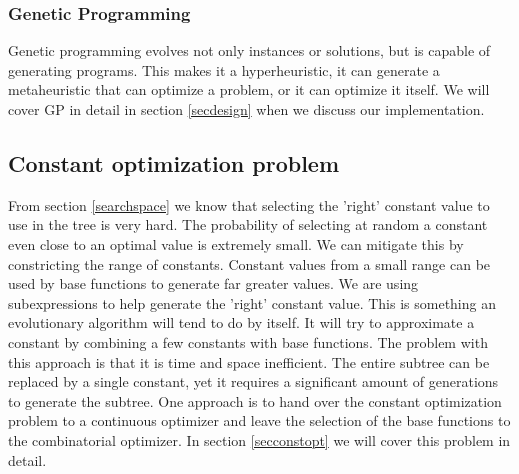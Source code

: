 \subsubsection{Genetic Programming}
Genetic programming \cite{GP} evolves not only instances or solutions, but is capable of generating programs. This makes it a hyperheuristic, it can generate a metaheuristic that can optimize a problem, or it can optimize it itself. 
We will cover GP in detail in section \ref{secdesign}  when we discuss our implementation.

\subsection{Constant optimization problem}
From section \ref{searchspace} we know that selecting the 'right' constant value to use in the tree is very hard. The probability of selecting at random a constant even close to an optimal value is extremely small. We can mitigate this by constricting the range of constants. Constant values from a small range can be used by base functions to generate far greater values. We are using subexpressions to help generate the 'right' constant value. This is something an evolutionary algorithm will tend to do by itself. It will try to approximate a constant by combining a few constants with base functions. The problem with this approach is that it is time and space inefficient. The entire subtree can be replaced by a single constant, yet it requires a significant amount of generations to generate the subtree. One approach is to hand over the constant optimization problem to a continuous optimizer and leave the selection of the base functions to the combinatorial optimizer. In section \ref{secconstopt} we will cover this problem in detail.


